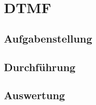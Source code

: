 \chapter{DTMF}\label{CDTMF}
\section{Aufgabenstellung}\label{TDTMF}
\section{Durchführung}\label{DDTMF}
\section{Auswertung}\label{ADTMF}